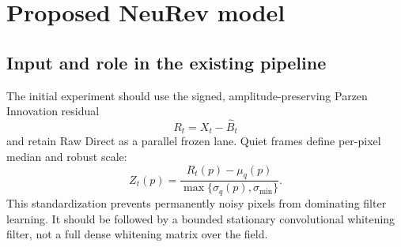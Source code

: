 \documentclass[11pt]{article}
\begin{document}
\section{Proposed NeuRev model}

\subsection{Input and role in the existing pipeline}

The initial experiment should use the signed, amplitude-preserving Parzen
Innovation residual
\begin{equation}
R_t=X_t-\widehat B_t
\end{equation}
and retain Raw Direct as a parallel frozen lane. Quiet frames define per-pixel
median and robust scale:
\begin{equation}
Z_t(p)
=
\frac{R_t(p)-\mu_q(p)}
{\max\{\sigma_q(p),\sigma_{\min}\}}.
\label{eq:quiet-standard}
\end{equation}
This standardization prevents permanently noisy pixels from dominating filter
learning. It should be followed by a bounded stationary convolutional whitening
filter, not a full dense whitening matrix over the field.
\end{document}
